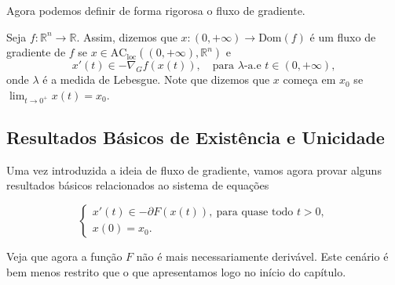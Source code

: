 Agora podemos definir de forma rigorosa o fluxo de gradiente.

\begin{definition}
    Seja $f:\mathbb R^n \to \mathbb R$.
    Assim, dizemos que $x:(0,+\infty) \to \text{Dom}(f)$ é um fluxo de gradiente
    de $f$ se $x \in \text{AC}_{\text{loc}}((0,+\infty), \mathbb R^n)$ e
    \begin{equation}
        x'(t) \in - \nabla_G f(x(t)), \quad \text{para } \lambda\text{-a.e } t \in (0,+\infty),
    \end{equation}
    onde $\lambda$ é a medida de Lebesgue. Note que dizemos que $x$ começa em $x_0$ se
    $\lim_{t \to 0^+} x(t) = x_0$.
\end{definition}

\subsection{Resultados Básicos de Existência e Unicidade}

Uma vez introduzida a ideia de fluxo de gradiente, vamos agora provar alguns
resultados básicos relacionados ao sistema de equações

\begin{equation}
    \begin{cases}
        x'(t) \in -\partial F(x(t)), \ \text{para quase todo } t>0,\\
        x(0)  = x_0.
    \end{cases}
    \label{eq:fluxograd}
\end{equation}

Veja que agora a função $F$ não é mais necessariamente derivável. Este cenário
é bem menos restrito que o que apresentamos logo no início do capítulo.

